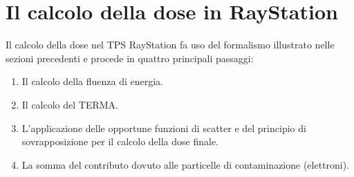 {\section{Il calcolo della dose in RayStation}
\label{sec:algo_Ray}
Il calcolo della dose nel TPS RayStation fa uso del formalismo illustrato nelle sezioni precedenti e procede in quattro principali passaggi:
\begin{enumerate}
\item Il calcolo della fluenza di energia.
\item Il calcolo del TERMA.
\item L'applicazione delle opportune funzioni di scatter e del principio di sovrapposizione per il calcolo della dose finale.
\item La somma del contributo dovuto alle particelle di contaminazione (elettroni).
\end{enumerate}

}
